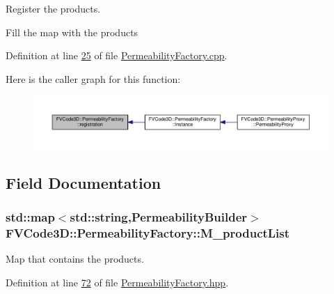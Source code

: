 Register the products. 

Fill the map with the products 

Definition at line \hyperlink{PermeabilityFactory_8cpp_source_l00025}{25} of file \hyperlink{PermeabilityFactory_8cpp_source}{Permeability\+Factory.\+cpp}.



Here is the caller graph for this function\+:
\nopagebreak
\begin{figure}[H]
\begin{center}
\leavevmode
\includegraphics[width=350pt]{classFVCode3D_1_1PermeabilityFactory_a6aad35b4bccce3c7aea9ed49c1739e5d_icgraph}
\end{center}
\end{figure}




\subsection{Field Documentation}
\subsubsection[{\texorpdfstring{M\+\_\+product\+List}{M_productList}}]{\setlength{\rightskip}{0pt plus 5cm}std\+::map$<$std\+::string,{\bf Permeability\+Builder}$>$ F\+V\+Code3\+D\+::\+Permeability\+Factory\+::\+M\+\_\+product\+List\hspace{0.3cm}{\ttfamily [private]}}\hypertarget{classFVCode3D_1_1PermeabilityFactory_a929e4768d02b4d006e8b2ace9dcc2354}{}\label{classFVCode3D_1_1PermeabilityFactory_a929e4768d02b4d006e8b2ace9dcc2354}


Map that contains the products. 



Definition at line \hyperlink{PermeabilityFactory_8hpp_source_l00072}{72} of file \hyperlink{PermeabilityFactory_8hpp_source}{Permeability\+Factory.\+hpp}.

